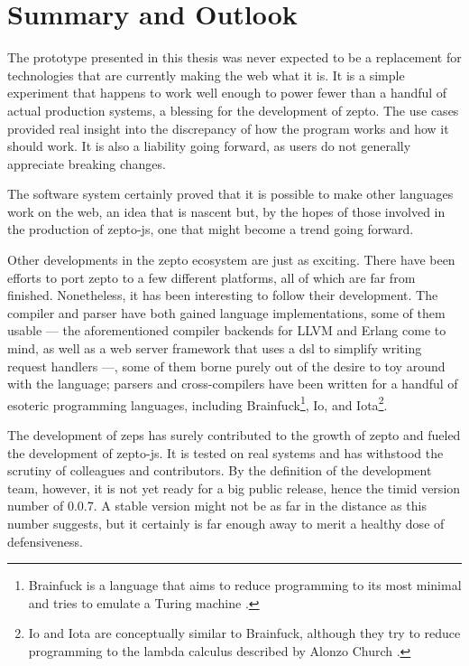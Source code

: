 \documentclass[oneside,11pt,xetex]{scrbook}
\begin{document}
\chapter{Summary and Outlook}
\label{chap:outlook}

The prototype presented in this thesis was never expected to be a replacement
for technologies that are currently making the web what it is. It is a simple
experiment that happens to work well enough to power fewer than a handful of
actual production systems, a blessing for the development of zepto. The
use cases provided real insight into the discrepancy of how the program
works and how it should work. It is also a liability going forward, as users
do not generally appreciate breaking changes.

The software system certainly proved that it is possible to make other
languages work on the web, an idea that is nascent but, by the hopes of
those involved in the production of zepto-js, one that might become a trend
going forward.

Other developments in the zepto ecosystem are just as exciting. There have
been efforts to port zepto to a few different platforms, all of which are
far from finished. Nonetheless, it has been interesting to follow their development.
The compiler and parser have both gained language implementations, some of
them usable --- the aforementioned compiler backends for LLVM and Erlang come to
mind, as well as a web server framework that uses a \gls{dsl} to simplify writing
request handlers ---, some of them borne purely out of the desire to toy around
with the language; parsers and cross-compilers have been written for a handful of
esoteric programming languages, including Brainfuck\footnote{Brainfuck is a language
that aims to reduce programming to its most minimal and tries to emulate a Turing
machine \parencite{BFK}.}, Io, and Iota\footnote{Io and Iota are conceptually similar
to Brainfuck, although they try to reduce programming to the lambda calculus described
by Alonzo Church \parencite{IOT}.}.

The development of \gls{zeps} has surely contributed to the growth of zepto and
fueled the development of zepto-js. It is tested on real systems and has
withstood the scrutiny of colleagues and contributors. By the definition of the
development team, however, it is not yet ready for a big public release, hence
the timid version number of 0.0.7. A stable version might not be as far in the
distance as this number suggests, but it certainly is far enough away to merit
a healthy dose of defensiveness.
\end{document}
